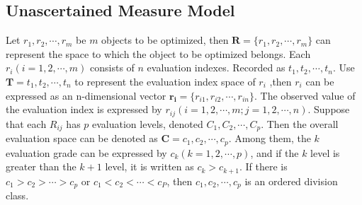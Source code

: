 \documentclass[12pt]{article}  %
\begin{document}
\subsection{Unascertained Measure Model}
Let $r_1,r_2,\cdots ,r_m$ be $m$ objects to be optimized, then $\bm{R}=\{r_1,r_2,\cdots ,r_m\}$ can represent the space to which the object to be optimized belongs.
Each $r_i(i = 1,2,\cdots ,m)$ consists of $n$ evaluation indexes. Recorded as $t_1, t_2,\cdots ,t_n$. 
Use $\bm{T}=t_1, t_2,\cdots ,t_n$ to represent the evaluation index space of $r_i$ ,then $r_i$ can be expressed as an n-dimensional vector $\bm{r_i}=\{r_{i1},r_{i2},\cdots ,r_{in}\}$. 
The observed value of the evaluation index is expressed by $r_{ij}(i=1,2,\cdots , m; j=1,2,\cdots ,n)$. 
Suppose that each $R_{ij}$ has $p$ evaluation levels, denoted $C_1,C_2,\cdots ,C_p$. 
Then the overall evaluation space can be denoted as $\bm{C}={c_1,c_2,\cdots ,c_p}$. 
Among them, the $k$ evaluation grade can be expressed by $c_k(k=1,2,\cdots ,p)$, and if the $k$ level is greater than the $k+1$ level, it is written as $c_k>c_{k+1}$.
If there is $c_1>c_2>\cdots >c_p$ or $c_1<c_2<\cdots <c_P$, then $c_1, c_2,\cdots ,c_p$ is an ordered division class.
\end{document}
